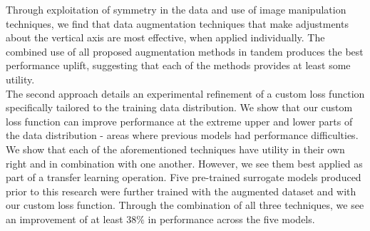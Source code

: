 \noindent
Through exploitation of symmetry in the data and use of image manipulation techniques, we find that data augmentation techniques that make adjustments about the vertical axis are most effective, when applied individually. The combined use of all proposed augmentation methods in tandem produces the best performance uplift, suggesting that each of the methods provides at least some utility.
\\

\noindent
The second approach details an experimental refinement of a custom loss function specifically tailored to the training data distribution. We show that our custom loss function can improve performance at the extreme upper and lower parts of the data distribution - areas where previous models had performance difficulties.
\\

\noindent
We show that each of the aforementioned techniques have utility in their own right and in combination with one another. However, we see them best applied as part of a transfer learning operation. Five pre-trained surrogate models produced prior to this research were further trained with the augmented dataset and with our custom loss function. Through the combination of all three techniques, we see an improvement of at least $38\%$ in performance across the five models.


